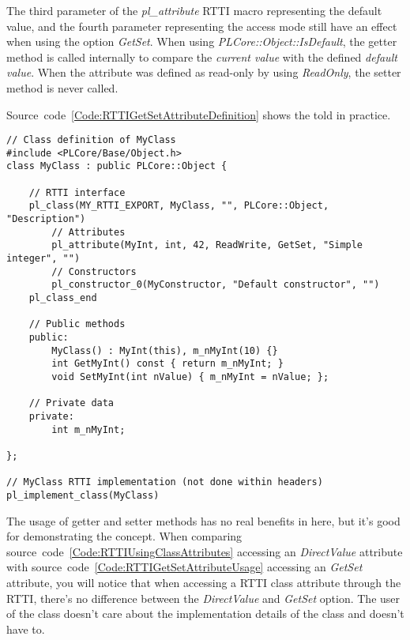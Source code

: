 The third parameter of the \emph{pl\_attribute} \ac{RTTI} macro representing the default value, and the fourth parameter representing the access mode still have an effect when using the option \emph{GetSet}. When using \emph{PLCore::Object::IsDefault}, the getter method is called internally to compare the \emph{current value} with the defined \emph{default value}. When the attribute was defined as read-only by using \emph{ReadOnly}, the setter method is never called.

Source~code~\ref{Code:RTTIGetSetAttributeDefinition} shows the told in practice.
\begin{lstlisting}[label=Code:RTTIGetSetAttributeDefinition,caption={Defining an \ac{RTTI} class attribute using getter and setter methods}]
// Class definition of MyClass
#include <PLCore/Base/Object.h>
class MyClass : public PLCore::Object {

	// RTTI interface
	pl_class(MY_RTTI_EXPORT, MyClass, "", PLCore::Object, "Description")
		// Attributes
		pl_attribute(MyInt, int, 42, ReadWrite, GetSet, "Simple integer", "")
		// Constructors
		pl_constructor_0(MyConstructor, "Default constructor", "")
	pl_class_end

	// Public methods
	public:
		MyClass() : MyInt(this), m_nMyInt(10) {}
		int GetMyInt() const { return m_nMyInt; }
		void SetMyInt(int nValue) { m_nMyInt = nValue; };

	// Private data
	private:
		int m_nMyInt;

};

// MyClass RTTI implementation (not done within headers)
pl_implement_class(MyClass)
\end{lstlisting}
The usage of getter and setter methods has no real benefits in here, but it's good for demonstrating the concept. When comparing source~code~\ref{Code:RTTIUsingClassAttributes} accessing an \emph{DirectValue} attribute with source~code~\ref{Code:RTTIGetSetAttributeUsage} accessing an \emph{GetSet} attribute, you will notice that when accessing a \ac{RTTI} class attribute through the \ac{RTTI}, there's no difference between the \emph{DirectValue} and \emph{GetSet} option. The user of the class doesn't care about the implementation details of the class and doesn't have to.
